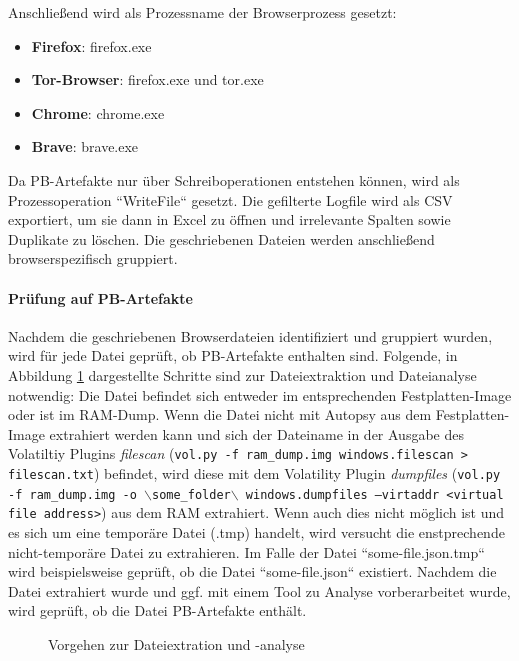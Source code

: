 Anschließend wird als Prozessname der Browserprozess gesetzt:
\begin{itemize}
\item \textbf{Firefox}: firefox.exe
\item \textbf{Tor-Browser}: firefox.exe und tor.exe
\item \textbf{Chrome}: chrome.exe
\item \textbf{Brave}: brave.exe
\end{itemize}
Da PB-Artefakte nur über Schreiboperationen entstehen können, wird als Prozessoperation ``WriteFile`` gesetzt.
Die gefilterte Logfile wird als CSV exportiert, um sie dann in Excel zu öffnen und irrelevante Spalten sowie Duplikate zu löschen.
Die geschriebenen Dateien werden anschließend browserspezifisch gruppiert.

\paragraph*{Prüfung auf PB-Artefakte}
Nachdem die geschriebenen Browserdateien identifiziert und gruppiert wurden, wird für jede Datei geprüft, ob PB-Artefakte enthalten sind. Folgende, in Abbildung \ref{img:dateiextraktion-und-analyse} dargestellte Schritte sind zur Dateiextraktion und Dateianalyse notwendig:
Die Datei befindet sich entweder im entsprechenden Festplatten-Image oder ist im RAM-Dump. 
Wenn die Datei nicht mit Autopsy aus dem Festplatten-Image extrahiert werden kann und sich der Dateiname in der Ausgabe des Volatiltiy Plugins \textit{filescan} (\texttt{vol.py -f ram\_dump.img windows.filescan > filescan.txt}) befindet, wird diese mit dem Volatility Plugin \textit{dumpfiles} (\texttt{vol.py -f ram\_dump.img -o $\backslash$some\_folder$\backslash$ windows.dumpfiles --virtaddr <virtual file address>}) aus dem RAM extrahiert.
Wenn auch dies nicht möglich ist und es sich um eine temporäre Datei (.tmp) handelt, wird versucht die enstprechende nicht-temporäre Datei zu extrahieren. 
Im Falle der Datei ``some-file.json.tmp`` wird beispielsweise geprüft, ob die Datei ``some-file.json`` existiert.
Nachdem die Datei extrahiert wurde und ggf. mit einem Tool zu Analyse vorberarbeitet wurde, wird geprüft, ob die Datei PB-Artefakte enthält.
\begin{figure}[h!]
	\centering
	\small
	\centerline{\resizebox{\linewidth}{!}{}}
	\caption{Vorgehen zur Dateiextration und -analyse}
	\label{img:dateiextraktion-und-analyse}
\end{figure}

